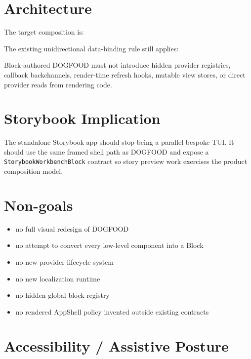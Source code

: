 \section{Architecture}\label{record-109-architecture}

The target composition is:



The existing unidirectional data-binding rule still applies:



Block-authored DOGFOOD must not introduce hidden provider registries, callback backchannels, render-time refresh hooks, mutable view stores, or direct provider reads from rendering code.

\section{Storybook Implication}\label{record-109-storybook-implication}

The standalone Storybook app should stop being a parallel bespoke TUI. It should use the same framed shell path as DOGFOOD and expose a \texttt{S\allowbreak{}t\allowbreak{}o\allowbreak{}r\allowbreak{}y\allowbreak{}b\allowbreak{}o\allowbreak{}o\allowbreak{}k\allowbreak{}W\allowbreak{}o\allowbreak{}r\allowbreak{}k\allowbreak{}b\allowbreak{}e\allowbreak{}n\allowbreak{}c\allowbreak{}h\allowbreak{}B\allowbreak{}l\allowbreak{}o\allowbreak{}c\allowbreak{}k} contract so story preview work exercises the product composition model.

\section{Non-goals}\label{record-109-non-goals}

\begin{itemize}
\tightlist
\item
  no full visual redesign of DOGFOOD
\item
  no attempt to convert every low-level component into a Block
\item
  no new provider lifecycle system
\item
  no new localization runtime
\item
  no hidden global block registry
\item
  no rendered AppShell policy invented outside existing contracts
\end{itemize}

\section{Accessibility / Assistive Posture}\label{record-109-accessibility-assistive-posture}

